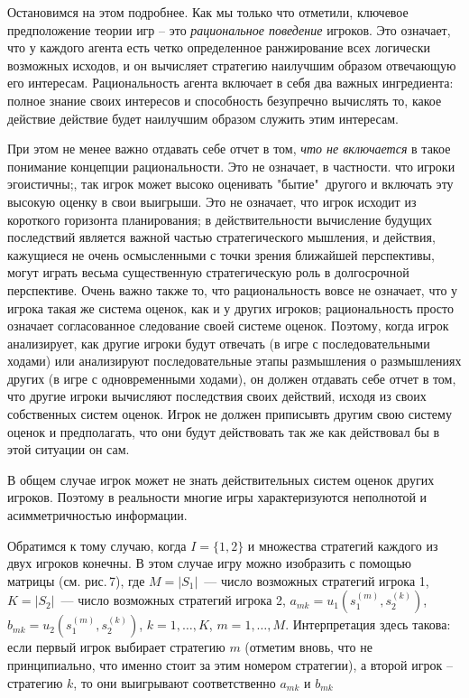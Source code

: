 Остановимся на этом подробнее. Как мы только что отметили, ключевое
предположение теории игр -- это \emph{рациональное поведение}
игроков. Это означает, что у каждого агента есть четко определенное
ранжирование всех логически возможных исходов, и он вычисляет
стратегию наилучшим образом отвечающую его интересам. Рациональность
агента включает в себя два важных ингредиента: полное знание своих
интересов и способность безупречно вычислять то, какое действие
действие будет наилучшим образом служить этим интересам.

При этом не менее важно отдавать себе отчет в том, \emph{что не
включается} в такое понимание концепции рациональности. Это не
означает, в частности. что игроки эгоистичны;, так игрок может
высоко оценивать "бытие"\, другого и включать эту высокую оценку в
свои выигрыши. Это не означает, что игрок исходит из короткого
горизонта планирования; в действительности вычисление будущих
последствий является важной частью стратегического мышления, и
действия, кажущиеся не очень осмысленными с точки зрения ближайшей
перспективы, могут играть весьма существенную стратегическую роль в
долгосрочной перспективе. Очень важно также то, что рациональность
вовсе не означает, что у игрока такая же система оценок, как и у
других игроков; рациональность просто означает согласованное
следование своей системе оценок. Поэтому, когда игрок анализирует,
как другие игроки будут отвечать (в игре с последовательными ходами)
или анализируют последовательные этапы размышления о размышлениях
других (в игре с одновременными ходами), он должен отдавать себе
отчет в том, что другие игроки вычисляют последствия своих действий,
исходя из своих собственных систем оценок. Игрок не должен
приписывть другим свою систему оценок и предполагать, что они будут
действовать так же как действовал бы в этой ситуации он сам.

В общем случае игрок может не знать действительных систем оценок
других игроков. Поэтому в реальности многие игры характеризуются
неполнотой и асимметричностью информации.

Обратимся к тому случаю, когда $I=\{1,2\}$ и множества стратегий
каждого из двух игроков конечны.  В этом случае игру можно
изобразить с помощью матрицы (см. рис.\,7), где $M=|S_1|$~---
число возможных стратегий игрока 1, $K=|S_2|$~--- число возможных
стратегий игрока 2, $a_{mk}=u_1(s^{(m)}_1,s^{(k)}_2)$,
$b_{mk}=u_2(s^{(m)}_1,s^{(k)}_2)$, $k=1,\ldots,K$, $m=1,\ldots,M$.
Интерпретация здесь такова: если первый игрок выбирает стратегию
$m$ (отметим вновь, что не принципиально, что именно стоит за
этим номером стратегии), а второй игрок -- стратегию $k$, то они
выигрывают соответственно $a_{mk}$ и $b_{mk}$

